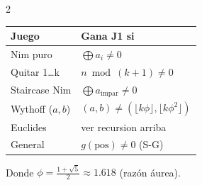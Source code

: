 \documentclass[10pt,a4paper]{article}
\begin{document}
\begin{multicols}{2}
\begin{center}
\small
\begin{tabular}{|l|l|}
\hline
\textbf{Juego} & \textbf{Gana J1 si} \\
\hline
Nim puro & $\bigoplus a_i \neq 0$ \\
\hline
Quitar 1\ldots k & $n \bmod (k+1) \neq 0$ \\
\hline
Staircase Nim & $\bigoplus a_{\text{impar}} \neq 0$ \\
\hline
Wythoff ($a,b$) & $(a,b) \neq (\lfloor k\phi \rfloor, \lfloor k\phi^2 \rfloor)$ \\
\hline
Euclides & ver recursion arriba \\
\hline
General & $g(\text{pos}) \neq 0$ (S-G) \\
\hline
\end{tabular}
\end{center}

Donde $\phi = \frac{1+\sqrt{5}}{2} \approx 1.618$ (raz\'on \'aurea).

\end{multicols}
\newpage

\end{document}
